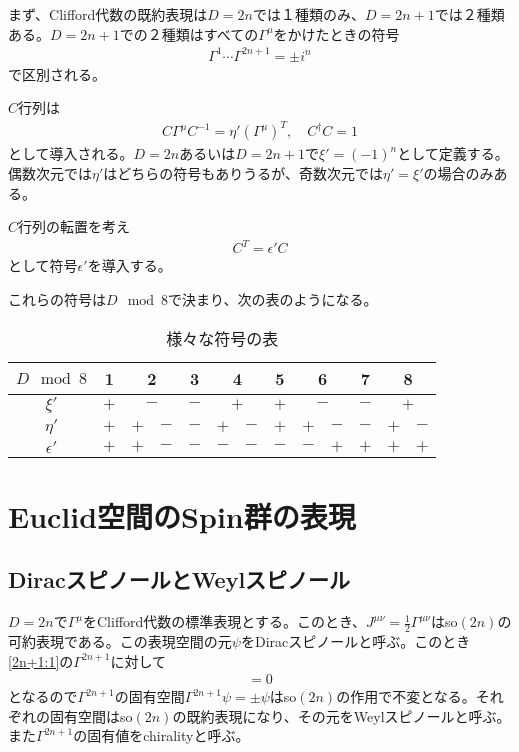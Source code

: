 \documentclass[12pt,a4paper,dvipdfmx]{jlreq}
\begin{document}
まず、Clifford代数の既約表現は$D=2n$では１種類のみ、$D=2n+1$では２種類ある。$D=2n+1$での２種類はすべての$\Gamma^{\mu}$をかけたときの符号
\begin{align*}
  \Gamma^{1}\cdots \Gamma^{2n+1}=\pm i^n
\end{align*}
で区別される。

$C$行列は
\begin{align*}
  C\Gamma^{\mu}C^{-1}=\eta'(\Gamma^{\mu})^T,\quad
  C^{\dag}C=1
\end{align*}
として導入される。$D=2n$あるいは$D=2n+1$で$\xi'=(-1)^n$として定義する。偶数次元では$\eta'$はどちらの符号もありうるが、奇数次元では$\eta'=\xi'$の場合のみある。

$C$行列の転置を考え
\begin{align*}
  C^{T}=\epsilon' C
\end{align*}
として符号$\epsilon'$を導入する。

これらの符号は$D \mod 8$で決まり、次の表のようになる。
\begin{table}[htb]
\begin{center}
  \begin{tabular}{|c|c|c|c|c|c|c|c|c|c|c|c|c|}\hline
    $D \mod 8$ & 1 & \multicolumn{2}{|c|}{2} & 3 & \multicolumn{2}{|c|}{4} & 5 & \multicolumn{2}{|c|}{6} & 7 & \multicolumn{2}{|c|}{8} \\ \hline
    $\xi'$ & $+$ & \multicolumn{2}{|c|}{$-$} & $-$ & \multicolumn{2}{|c|}{$+$} & $+$ & \multicolumn{2}{|c|}{$-$} & $-$ & \multicolumn{2}{|c|}{$+$} \\\hline
    $\eta'$ & $+$ & $+$ & $-$ &  $-$ & $+$ & $-$ & $+$ & $+$ & $-$ & $-$ & $+$ & $-$ \\ \hline
    $\epsilon'$ & $+$ & $+$ & $-$ & $-$ & $-$ & $-$ & $-$ & $-$ & $+$ & $+$ & $+$ & $+$ \\ \hline
  \end{tabular}
\end{center} 
\caption{様々な符号の表}
\label{sign}
\end{table}

\section{Euclid空間のSpin群の表現}
\subsection{DiracスピノールとWeylスピノール}
$D=2n$で$\Gamma^{\mu}$をClifford代数の標準表現とする。このとき、$J^{\mu\nu}=\frac12 \Gamma^{\mu\nu}$はso$(2n)$の可約表現である。この表現空間の元$\psi$をDiracスピノールと呼ぶ。このとき\eqref{2n+1:1}の$\Gamma^{2n+1}$に対して
\begin{align*}
  [\Gamma^{2n+1},J^{\mu\nu}]=0
\end{align*}
となるので$\Gamma^{2n+1}$の固有空間$\Gamma^{2n+1}\psi=\pm \psi$はso$(2n)$の作用で不変となる。それぞれの固有空間はso$(2n)$の既約表現になり、その元をWeylスピノールと呼ぶ。また$\Gamma^{2n+1}$の固有値をchiralityと呼ぶ。
\end{document}
